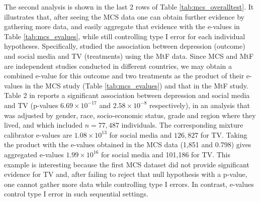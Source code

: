 \documentclass[pdflatex,sn-mathphys-num]{sn-jnl}%
\theoremstyle{thmstyleone}%
\theoremstyle{thmstyletwo}%
\theoremstyle{thmstylethree}%
\begin{document}
The second analysis is shown in the last 2 rows of Table \ref{tab:mcs_overalltest}. It illustrates that, after seeing the MCS data one can obtain further evidence by gathering more data, and easily aggregate that evidence with the e-values in Table \ref{tab:mcs_evalues}, while still controlling type I error for each individual hypotheses.
Specifically, \cite{twenge:2018} studied the association between depression (outcome) and social media and TV (treatments) using the MtF data.
Since MCS and MtF are independent studies conducted in different countries, we may obtain a combined e-value for this outcome and two treatments as the product of their e-values in the MCS study (Table \ref{tab:mcs_evalues}) and that in the MtF study.
Table 2 in \cite{twenge:2018} reports a significant association between depression and social media and TV (p-values $6.69 \times 10^{-17}$ and $2.58 \times 10^{-8}$ respectively), 
in an analysis that was adjusted by gender, race, socio-economic status, grade and region where they lived, and which included $n=77,487$ individuals.
The corresponding mixture calibrator e-values are $1.08 \times 10^{13}$ for social media and $126,827$ for TV.
Taking the product with the e-values obtained in the MCS data (1,851 and 0.798) gives aggregated e-values $1.99 \times 10^{16}$ for social media and 101,186 for TV.
This example is interesting because the first MCS dataset did not provide significant evidence for TV and, after failing to reject that null hypothesis with a p-value, one cannot gather more data while controlling type I errors. In contrast, e-values control type I error in such sequential settings.
\color{black}





\end{document}
